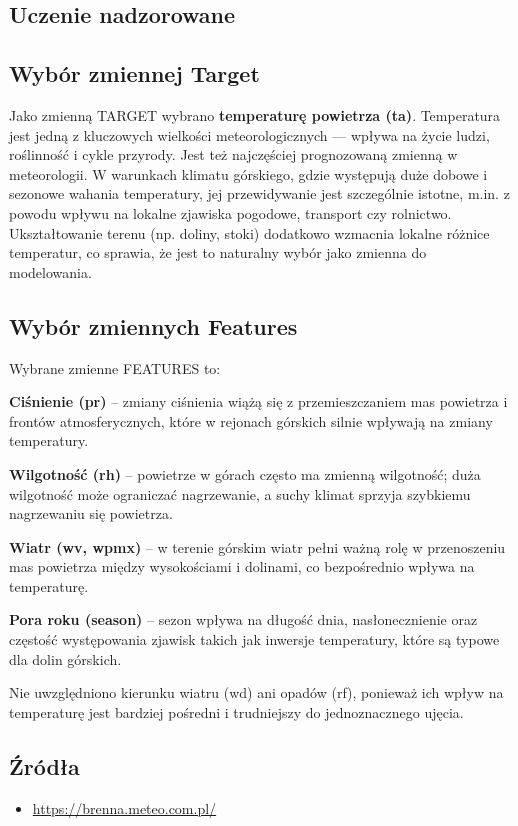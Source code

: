\documentclass[10pt,a4paper]{article}
\begin{document}
\vspace{1.5em} 
\subsection{Uczenie nadzorowane}
\vspace{1.5em} 
\subsection*{Wybór zmiennej Target}
Jako zmienną TARGET wybrano \textbf{temperaturę powietrza (ta)}.
Temperatura jest jedną z kluczowych wielkości meteorologicznych — wpływa na życie ludzi, roślinność i cykle przyrody. Jest też najczęściej prognozowaną zmienną w meteorologii. W warunkach klimatu górskiego, gdzie występują duże dobowe i sezonowe wahania temperatury, jej przewidywanie jest szczególnie istotne, m.in. z powodu wpływu na lokalne zjawiska pogodowe, transport czy rolnictwo. Ukształtowanie terenu (np. doliny, stoki) dodatkowo wzmacnia lokalne różnice temperatur, co sprawia, że jest to naturalny wybór jako zmienna do modelowania.

\vspace{1.5em} 
\subsection*{Wybór zmiennych Features}
Wybrane zmienne FEATURES to:

\noindent \textbf{Ciśnienie (pr)} – zmiany ciśnienia wiążą się z przemieszczaniem mas powietrza i frontów atmosferycznych, które w rejonach górskich silnie wpływają na zmiany temperatury.

\noindent \textbf{Wilgotność (rh)} – powietrze w górach często ma zmienną wilgotność; duża wilgotność może ograniczać nagrzewanie, a suchy klimat sprzyja szybkiemu nagrzewaniu się powietrza.

\noindent \textbf{Wiatr (wv, wpmx)} – w terenie górskim wiatr pełni ważną rolę w przenoszeniu mas powietrza między wysokościami i dolinami, co bezpośrednio wpływa na temperaturę.

\noindent \textbf{Pora roku (season)} – sezon wpływa na długość dnia, nasłonecznienie oraz częstość występowania zjawisk takich jak inwersje temperatury, które są typowe dla dolin górskich.


\vspace{1.5em}
\par
\hspace{0.75cm}
Nie uwzględniono kierunku wiatru (wd) ani opadów (rf), ponieważ ich wpływ na temperaturę jest bardziej pośredni i trudniejszy do jednoznacznego ujęcia.

\vspace{5em} 
\subsection*{Źródła}
\begin{itemize}
	\item \url{https://brenna.meteo.com.pl/}
\end{itemize}
\end{document}
